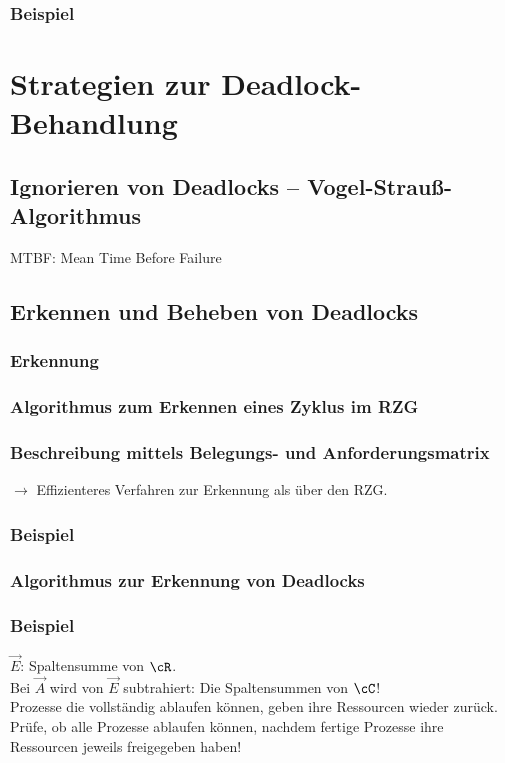 \subsubsection*{Beispiel}

\section{Strategien zur Deadlock-Behandlung}
\subsection{Ignorieren von Deadlocks -- Vogel-Strauß-Algorithmus}
MTBF: Mean Time Before Failure
\subsection{Erkennen und Beheben von Deadlocks}
\subsubsection{Erkennung}
\subsubsection{Algorithmus zum Erkennen eines Zyklus im RZG}
\subsubsection{Beschreibung mittels Belegungs- und Anforderungsmatrix}
$\to$ Effizienteres Verfahren zur Erkennung als über den RZG.
\subsubsection*{Beispiel}
\subsubsection{Algorithmus zur Erkennung von Deadlocks}
\subsubsection*{Beispiel}
$\vec{E}$: Spaltensumme von $\cR$.\\
Bei $\vec{A}$ wird von $\vec{E}$ subtrahiert: Die Spaltensummen von $\cC$!\bigskip\\
Prozesse die vollständig ablaufen können, geben ihre Ressourcen wieder zurück. Prüfe, ob alle Prozesse ablaufen können, nachdem fertige Prozesse ihre Ressourcen jeweils freigegeben haben!

